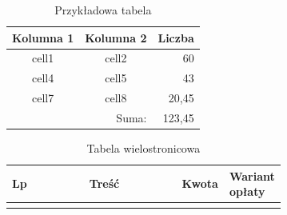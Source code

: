 \documentclass[
    left=2.5cm,         %
    right=2.5cm,        %
    top=2.5cm,          %
    bottom=3cm,         %
    bindingoffset=6mm,  %
    nohyphenation=true %
]{eiti/eiti-thesis} %
\begin{document}
\begin{table}[!h] \label{tab:tabela1} \centering
	\caption{Przykładowa tabela}
	\begin{tabular} {| c | c | r |} \hline
		Kolumna 1 & Kolumna 2 & Liczba \\ \hline\hline
		cell1 & cell2 & 60 \\ \hline
		cell4 & cell5 & 43 \\ \hline
		cell7 & cell8 & 20,45 \\ \hline
		\multicolumn{2}{|r|}{Suma:} & 123,45 \\ \hline
	\end{tabular}
\end{table}

\kant[2]

\begin{longtable}{| c | m{0.58\linewidth} | r | m{0.1\linewidth} |} 
	\caption{Tabela wielostronicowa} \\ 
	\hline
	Lp & \multicolumn{1}{c|}{Treść} & \multicolumn{1}{c|}{Kwota} & \multicolumn{1}{m{0.1\linewidth}|}{Wariant opłaty} \\ \hline\hline \endfirsthead
	
	\endfoot
	\hline \endlastfoot
	

\end{longtable}
\end{document}
